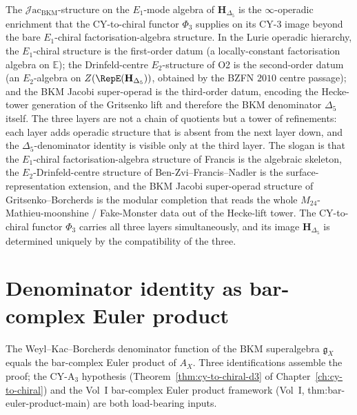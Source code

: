 \begin{remark}
\label{rem:hdelta5-bkm-jacobi-super-operad-hidden-structure}
The $\mathcal J\mathrm{ac}_{\mathrm{BKM}}$-structure on the $E_1$-mode
algebra of $\mathbf H_{\Delta_5}$ is the $\infty$-operadic enrichment
that the CY-to-chiral functor $\Phi_3$ supplies on its CY-$3$ image
beyond the bare $E_1$-chiral factorisation-algebra structure. In
the Lurie operadic hierarchy, the $E_1$-chiral structure is the
first-order datum (a locally-constant factorisation algebra on
$\mathbb E$); the Drinfeld-centre $E_2$-structure of O2 is the
second-order datum (an $E_2$-algebra on $Z(\RepE(\mathbf H_{\Delta_5}))$,
obtained by the BZFN $2010$ centre passage); and the BKM Jacobi
super-operad is the third-order datum, encoding the Hecke-tower
generation of the Gritsenko lift and therefore the BKM denominator
$\Delta_5$ itself. The three layers are not a chain of quotients but
a tower of refinements: each layer adds operadic structure that is
absent from the next layer down, and the $\Delta_5$-denominator
identity is visible only at the third layer. The slogan is that the
$E_1$-chiral factorisation-algebra structure of Francis is the
algebraic skeleton, the $E_2$-Drinfeld-centre structure of
Ben-Zvi--Francis--Nadler is the surface-representation extension, and
the BKM Jacobi super-operad structure of Gritsenko--Borcherds is the
modular completion that reads the whole $M_{24}$-Mathieu-moonshine /
Fake-Monster data out of the Hecke-lift tower. The CY-to-chiral
functor $\Phi_3$ carries all three layers simultaneously, and its
image $\mathbf H_{\Delta_5}$ is determined uniquely by the
compatibility of the three.
\end{remark}

\section{Denominator identity as bar-complex Euler product}
\label{sec:thy-denom-bar-euler}

The Weyl--Kac--Borcherds denominator function of the BKM superalgebra $\mathfrak{g}_X$ equals the bar-complex Euler product of $A_X$. Three identifications assemble the proof; the CY-A$_3$ hypothesis (Theorem~\ref{thm:cy-to-chiral-d3} of Chapter~\ref{ch:cy-to-chiral}) and the Vol~I bar-complex Euler product framework (Vol~I, thm:bar-euler-product-main) are both load-bearing inputs.


